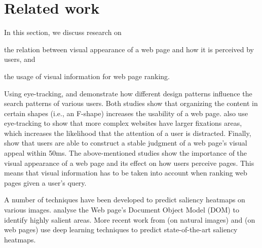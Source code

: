 
\section{Related work}\label{sec:relatedwork}
In this section, we discuss research on
\begin{inparaenum}[(i)]
\item the relation between visual appearance of a web page and how it is perceived by users, and
\item the usage of visual information for web page ranking.
\end{inparaenum} 


Using eye-tracking, \citet{nielsen2006f} and \citet{pernice2017f} demonstrate how different design patterns  influence the search patterns  of various users.
Both studies show that organizing the content in certain shapes (i.e., an F-shape) increases the usability of a web page. 
\citet{wang2014eye} also use eye-tracking to show that more complex websites  have larger fixations areas, which increases the likelihood that the attention of a user is distracted.
Finally, \citet{lindgaard2006attention} show that users are able to construct a stable judgment of a web page's visual appeal within 50ms. 
The above-mentioned studies show the importance of the visual appearance of a web page and its effect on how users perceive pages.
This means that visual information has to be taken into account when ranking web pages given a user's query.

A number of techniques have been developed to predict saliency heatmaps on various images. \citet{buscher2009you} analyse the Web page's Document Object Model (DOM) to identify highly salient areas. More recent work from \citet{kummerer2016deepgaze} (on natural images) and \citet{shan2017two} (on web pages) use deep learning techniques to predict state-of-the-art saliency heatmaps. 

